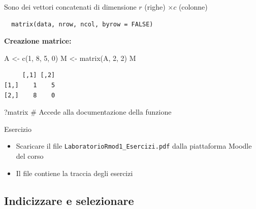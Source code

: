 \documentclass[
  ignorenonframetext,
  compress, aspectratio=149]{beamer}
\newenvironment{Shaded}{}{}
\newcommand{\CommentTok}[1]{\textcolor[rgb]{0.54,0.53,0.53}{#1}}
\newcommand{\DecValTok}[1]{\textcolor[rgb]{0.69,0.50,0.00}{#1}}
\newcommand{\FunctionTok}[1]{\textcolor[rgb]{0.39,0.29,0.61}{#1}}
\newcommand{\NormalTok}[1]{\textcolor[rgb]{0.12,0.11,0.11}{#1}}
\newcommand{\OtherTok}[1]{\textcolor[rgb]{0.00,0.43,0.16}{#1}}
\providecommand{\tightlist}{%
  \setlength{\itemsep}{0pt}\setlength{\parskip}{0pt}}
\begin{document}
\begin{frame}[fragile]{}
\label{section-10}
Sono dei vettori concatenati di dimensione \(r\) (righe) \(\times c\)
(colonne)

\begin{verbatim}
  matrix(data, nrow, ncol, byrow = FALSE)
\end{verbatim}

\pause

\textbf{Creazione matrice:}

\begin{Shaded}
\begin{Highlighting}[]
\NormalTok{A }\OtherTok{\textless{}{-}} \FunctionTok{c}\NormalTok{(}\DecValTok{1}\NormalTok{, }\DecValTok{8}\NormalTok{, }\DecValTok{5}\NormalTok{, }\DecValTok{0}\NormalTok{)}
\NormalTok{M }\OtherTok{\textless{}{-}} \FunctionTok{matrix}\NormalTok{(A, }\DecValTok{2}\NormalTok{, }\DecValTok{2}\NormalTok{)}
\NormalTok{M}
\end{Highlighting}
\end{Shaded}

\begin{verbatim}
     [,1] [,2]
[1,]    1    5
[2,]    8    0
\end{verbatim}

\pause

\footnotesize

\begin{Shaded}
\begin{Highlighting}[]
\NormalTok{?matrix  }\CommentTok{\# Accede alla documentazione della funzione}
\end{Highlighting}
\end{Shaded}
\end{frame}

\begin{frame}[fragile]{Esercizio}
\label{esercizio}
\begin{itemize}
\tightlist
\item
  Scaricare il file \texttt{LaboratorioRmod1\_Esercizi.pdf} dalla
  piattaforma Moodle del corso
\item
  Il file contiene la traccia degli esercizi
\end{itemize}
\end{frame}

\subsection{Indicizzare e selezionare}\label{indicizzare-e-selezionare}
\end{document}
